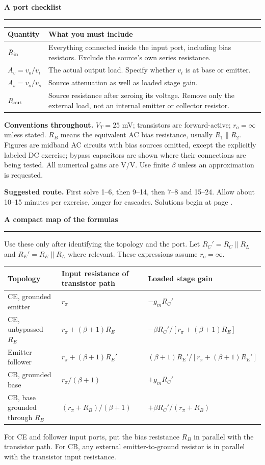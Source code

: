 \documentclass[11pt,a4paper]{article}
\newcommand{\head}[1]{\par{\Large\bfseries\color{ink}#1}\par\vspace{3pt}\hrule\vspace{7pt}}
\begin{document}
\head{A port checklist}
\begin{center}\begin{tabular}{p{3.2cm}p{11.6cm}}\toprule
Quantity & What you must include\\\midrule
$R_{\rm in}$ & Everything connected inside the input port, including bias resistors. Exclude the source's own series resistance.\\
$A_v=v_o/v_i$ & The actual output load. Specify whether $v_i$ is at base or emitter.\\
$A_s=v_o/v_s$ & Source attenuation as well as loaded stage gain.\\
$R_{\rm out}$ & Source resistance after zeroing its voltage. Remove only the external load, not an internal emitter or collector resistor.\\\bottomrule
\end{tabular}\end{center}
\textbf{Conventions throughout.} $V_T=25$ mV; transistors are forward-active; $r_o=\infty$ unless stated. $R_B$ means the equivalent AC bias resistance, usually $R_1\parallel R_2$. Figures are midband AC circuits with bias sources omitted, except the explicitly labeled DC exercise; bypass capacitors are shown where their connections are being tested. All numerical gains are V/V. Use finite $\beta$ unless an approximation is requested.

\textbf{Suggested route.} First solve 1--6, then 9--14, then 7--8 and 15--24. Allow about 10--15 minutes per exercise, longer for cascades. Solutions begin at page \pageref{solutions}.
\newpage
\head{A compact map of the formulas}
Use these only after identifying the topology and the port. Let $R_C'=R_C\parallel R_L$ and $R_E'=R_E\parallel R_L$ where relevant. These expressions assume $r_o=\infty$.
\begin{center}\small\begin{tabular}{p{2.7cm}p{4.4cm}p{7.3cm}}\toprule
Topology & Input resistance of transistor path & Loaded stage gain\\\midrule
CE, grounded emitter & $r_\pi$ & $-g_mR_C'$\\[7pt]
CE, unbypassed $R_E$ & $r_\pi+(\beta+1)R_E$ & $-\beta R_C'/[r_\pi+(\beta+1)R_E]$\\[7pt]
Emitter follower & $r_\pi+(\beta+1)R_E'$ & $(\beta+1)R_E'/[r_\pi+(\beta+1)R_E']$\\[7pt]
CB, grounded base & $r_\pi/(\beta+1)$ & $+g_mR_C'$\\[7pt]
CB, base grounded through $R_B$ & $(r_\pi+R_B)/(\beta+1)$ & $+\beta R_C'/(r_\pi+R_B)$\\\bottomrule
\end{tabular}\end{center}
For CE and follower input ports, put the bias resistance $R_B$ in parallel with the transistor path. For CB, any external emitter-to-ground resistor is in parallel with the transistor input resistance.
\end{document}
